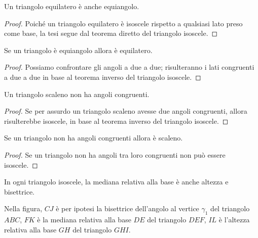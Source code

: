 \begin{corollario}
Un triangolo equilatero è anche equiangolo.
\end{corollario}

\begin{proof}
Poiché un triangolo equilatero è isoscele rispetto a qualsiasi lato 
preso come base, la tesi segue dal teorema diretto del triangolo 
isoscele.
\end{proof}

\begin{corollario}
Se un triangolo è equiangolo allora è equilatero.
\end{corollario}

\begin{proof}
Possiamo confrontare gli angoli a due a due; risulteranno i lati 
congruenti a due a due in base al teorema inverso del triangolo 
isoscele.
\end{proof}

\begin{corollario}
Un triangolo scaleno non ha angoli congruenti.
\end{corollario}

\begin{proof}
Se per assurdo un triangolo scaleno avesse due angoli congruenti, 
allora risulterebbe isoscele, in base al teorema inverso del 
triangolo isoscele.
\end{proof}

\begin{corollario}
Se un triangolo non ha angoli congruenti allora è scaleno.
\end{corollario}

\begin{proof}
Se un triangolo non ha angoli tra loro congruenti non può essere 
isoscele.
\end{proof}

\begin{proposizione}
In ogni triangolo isoscele, la mediana relativa alla base è anche 
altezza e bisettrice.
\end{proposizione}
Nella figura, $CJ$ è per ipotesi la bisettrice dell'angolo al vertice 
$\gamma_1$ del triangolo $ABC$, $FK$ è la mediana relativa alla base 
$DE$ del triangolo $DEF$, $IL$ è l'altezza relativa alla base $GH$ 
del triangolo $GHI$.


\begin{inaccessibleblock}
 \begin{figure}[htb]
\centering
\end{figure}
\end{inaccessibleblock}

